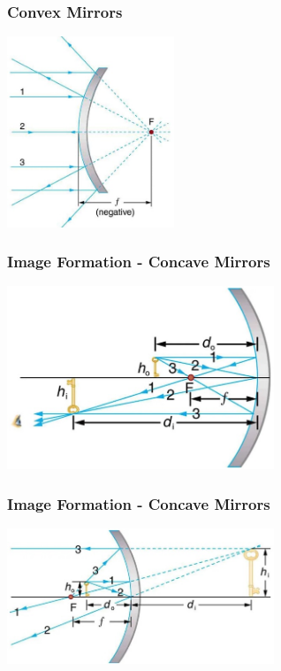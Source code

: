 \documentclass{beamer}
\begin{document}
\begin{frame}\frametitle{Convex Mirrors}

\begin{center}
\includegraphics[width=5cm]{fig/mirrorimage3.jpg}
\end{center}

\end{frame}

\begin{frame}\frametitle{Image Formation - Concave Mirrors}

\begin{center}
\includegraphics[width=8cm]{fig/mirrorimage4.jpg}
\end{center}

\end{frame}

\begin{frame}\frametitle{Image Formation - Concave Mirrors}

\begin{center}
\includegraphics[width=8cm]{fig/mirrorimage5.jpg}
\end{center}

\end{frame}
\end{document}
